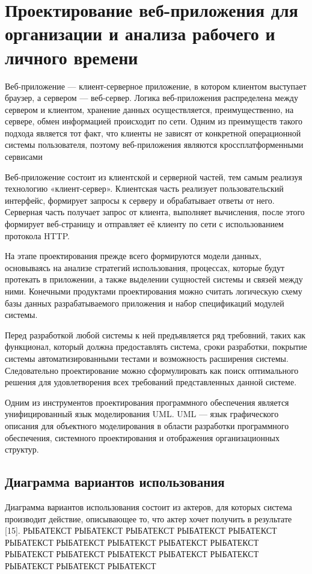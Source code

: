 \section{Проектирование веб-приложения для организации и анализа рабочего и личного времени}

Веб-приложение — клиент-серверное приложение, в котором клиентом выступает браузер, а сервером — веб-сервер. Логика веб-приложения распределена между сервером и клиентом, хранение данных осуществляется, преимущественно, на сервере, обмен информацией происходит по сети. Одним из преимуществ такого подхода является тот факт, что клиенты не зависят от конкретной операционной системы пользователя, поэтому веб-приложения являются кроссплатформенными сервисами

Веб-приложение состоит из клиентской и серверной частей, тем самым реализуя технологию «клиент-сервер». Клиентская часть реализует пользовательский интерфейс, формирует запросы к серверу и обрабатывает ответы от него. Серверная часть получает запрос от клиента, выполняет вычисления, после этого формирует веб-страницу и отправляет её клиенту по сети с использованием протокола HTTP.

На этапе проектирования прежде всего формируются модели данных, основываясь на анализе стратегий использования, процессах, которые будут протекать в приложении, а также выделении сущностей системы и связей между ними. Конечными продуктами проектирования можно считать логическую схему базы данных разрабатываемого приложения и набор спецификаций модулей системы.

Перед разработкой любой системы к ней предъявляется ряд требовний, таких как функционал, который должна предоставлять система, сроки разработки, покрытие системы автоматизированными тестами и возможность расширения системы. Следовательно проектирование можно сформулировать как поиск оптимального решения для удовлетворения всех требований представленных данной системе.

Одним из инструментов проектирования программного обеспечения является унифицированный язык моделирования UML. UML — язык графического описания для объектного моделирования в области разработки программного обеспечения, системного проектирования и отображения организационных структур.

\subsection{Диаграмма вариантов использования}
Диаграмма вариантов использования состоит из актеров, для которых система производит действие, описывающее то, что актер хочет получить в результате [15]. РЫБАТЕКСТ РЫБАТЕКСТ РЫБАТЕКСТ РЫБАТЕКСТ РЫБАТЕКСТ РЫБАТЕКСТ РЫБАТЕКСТ РЫБАТЕКСТ РЫБАТЕКСТ РЫБАТЕКСТ РЫБАТЕКСТ РЫБАТЕКСТ РЫБАТЕКСТ РЫБАТЕКСТ РЫБАТЕКСТ РЫБАТЕКСТ РЫБАТЕКСТ РЫБАТЕКСТ 

